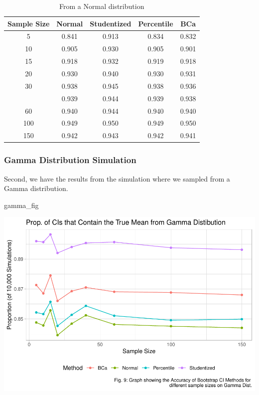 \documentclass[12pt]{article}
\newenvironment{Shaded}{\begin{snugshade}}{\end{snugshade}}
\newcommand{\NormalTok}[1]{#1}
\begin{document}
\begin{table}

\caption{\label{tab:create graphs}From a Normal distribution}
\centering
\begin{tabular}[t]{ccccc}
\toprule
Sample Size & Normal & Studentized & Percentile & BCa\\
\midrule
5 & 0.841 & 0.913 & 0.834 & 0.832\\
10 & 0.905 & 0.930 & 0.905 & 0.901\\
15 & 0.918 & 0.932 & 0.919 & 0.918\\
20 & 0.930 & 0.940 & 0.930 & 0.931\\
30 & 0.938 & 0.945 & 0.938 & 0.936\\
\addlinespace
40 & 0.939 & 0.944 & 0.939 & 0.938\\
60 & 0.940 & 0.944 & 0.940 & 0.940\\
100 & 0.949 & 0.950 & 0.949 & 0.950\\
150 & 0.942 & 0.943 & 0.942 & 0.941\\
\bottomrule
\end{tabular}
\end{table}

\hypertarget{gamma-distribution-simulation}{%
\subsubsection{Gamma Distribution
Simulation}\label{gamma-distribution-simulation}}

Second, we have the results from the simulation where we sampled from a
Gamma distribution.

\begin{Shaded}
\begin{Highlighting}[]
\NormalTok{gamma\_fig}
\end{Highlighting}
\end{Shaded}

\includegraphics{paper_files/figure-latex/unnamed-chunk-20-1.pdf}
\end{document}
